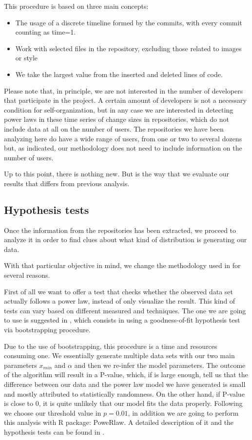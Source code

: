 \documentclass{article}
\begin{document}
This procedure is based on three main concepts:
\begin{itemize}
\item The usage of a discrete timeline formed by the commits, with
  every commit counting as time=1.
\item Work with selected files in the repository, excluding those
  related to images or style
\item We take the largest value from the inserted and deleted lines of
  code.
\end{itemize}

Please note that, in principle, we are not interested in the number of developers that participate in the project. A certain amount of developers is not a necessary condition for self-organization, but in any case we are interested in detecting power laws in these time series of change sizes in repositories, which do not include data at all on the number of users. The repositories we have been analyzing here do have a wide range of users, from one or two to several dozens but, as indicated, our methodology does not need to include information on the number of users.

Up to this point, there is nothing new. But is the way that we
evaluate our results that differs from previous analysis.

\subsection{Hypothesis tests}

Once the information from the repositories has been extracted, we
proceed to analyze it in order to find clues about what kind of
distribution is generating our data.

With that particular objective in mind, we change the methodology used
in \cite{merelo2017self} for several reasons.

First of all we want to offer a test that checks whether the observed
data set actually follows a power law, instead of only visualize the
result.  This kind of tests can vary based on different measured and
techniques. The one we are going to use is suggested in
\cite{clauset2009power}, which consists in using a goodness-of-fit
hypothesis test via bootstrapping procedure.

Due to the use of bootstrapping, this procedure is a time and
resources consuming one.  We essentially generate multiple data sets
with our two main parameters $x_{min}$ and $\alpha$ and then we
re-infer the model parameters. The outcome of the algorithm will
result in a P-value, which, if is large enough, tell us that the
difference between our data and the power law model we have generated
is small and mostly attributed to statistically randomness. On the
other hand, if P-value is close to 0, it is quite unlikely that our
model fits the data properly.  Following \cite{clauset2009power} we
choose our threshold value in $p=0.01$, in addition we are going to
perform this analysis with R package: PoweRlaw. A detailed description
of it and the hypothesis tests can be found in
\cite{gillespie2015power}.
\end{document}
